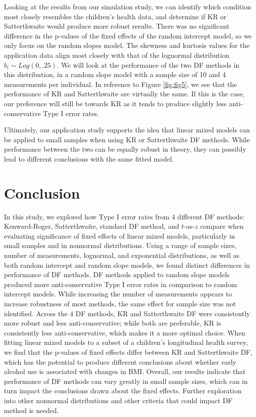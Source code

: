 \documentclass[12pt, twoside]{amherstthesis}
\begin{document}
Looking at the results from our simulation study, we can identify which condition most closely resembles the children's health data, and determine if KR or Satterthwaite would produce more robust results. There was no significant difference in the p-values of the fixed effects of the random intercept model, so we only focus on the random slopes model. The skewness and kurtosis values for the application data align most closely with that of the lognormal distribution \(b_i\sim\mathit{Log}(0,.25).\) We will look at the performance of the two DF methods in this distribution, in a random slope model with a sample size of 10 and 4 measurements per individual. In reference to Figure \ref{fig:fig5}, we see that the performance of KR and Satterthwaite are virtually the same. If this is the case, our preference will still be towards KR as it tends to produce slightly less anti-conservative Type I error rates.

Ultimately, our application study supports the idea that linear mixed models can be applied to small samples when using KR or Satterthwaite DF methods. While performance between the two can be equally robust in theory, they can possibly lead to different conclusions with the same fitted model.

\hypertarget{conclusion-1}{%
\chapter*{Conclusion}\label{conclusion-1}}

In this study, we explored how Type I error rates from 4 different DF methods: Kenward-Roger, Satterthwaite, standard DF method, and \(t\)-as-\(z\) compare when evaluating significance of fixed effects of linear mixed models, particularly in small samples and in nonnormal distributions. Using a range of sample sizes, number of measurements, lognormal, and exponential distributions, as well as both random intercept and random slope models, we found distinct differences in performance of DF methods. DF methods applied to random slope models produced more anti-conservative Type I error rates in comparison to random intercept models. While increasing the number of measurements appears to increase robustness of most methods, the same effect for sample size was not identified. Across the 4 DF methods, KR and Satterthwaite DF were consistently more robust and less anti-conservative; while both are preferable, KR is consistently less anti-conservative, which makes it a more optimal choice. When fitting linear mixed models to a subset of a children's longitudinal health survey, we find that the p-values of fixed effects differ between KR and Satterthwaite DF, which has the potential to produce different conclusions about whether early alcohol use is associated with changes in BMI. Overall, our results indicate that performance of DF methods can vary greatly in small sample sizes, which can in turn impact the conclusions drawn about the fixed effects. Further exploration into other nonnormal distributions and other criteria that could impact DF method is needed.
\end{document}
